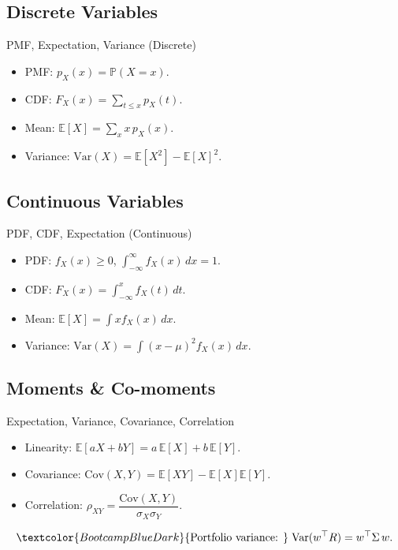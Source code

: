 \documentclass[aspectratio=169]{beamer}
\begin{document}
\subsection{Discrete Variables}
\begin{frame}{PMF, Expectation, Variance (Discrete)}
\begin{itemize}
  \item PMF: \(p_X(x)=\mathbb{P}(X=x)\).
  \item CDF: \(F_X(x)=\sum_{t\le x} p_X(t)\).
  \item Mean: \(\mathbb{E}[X]=\sum_x x\,p_X(x)\).
  \item Variance: \(\mathrm{Var}(X)=\mathbb{E}[X^2]-\mathbb{E}[X]^2\).
\end{itemize}
\end{frame}

\subsection{Continuous Variables}
\begin{frame}{PDF, CDF, Expectation (Continuous)}
\begin{itemize}
  \item PDF: \(f_X(x)\ge 0\), \(\int_{-\infty}^\infty f_X(x)\,dx=1\).
  \item CDF: \(F_X(x)=\int_{-\infty}^x f_X(t)\,dt\).
  \item Mean: \(\mathbb{E}[X]=\int x f_X(x)\,dx\).
  \item Variance: \(\mathrm{Var}(X)=\int (x-\mu)^2 f_X(x)\,dx\).
\end{itemize}
\end{frame}

\subsection{Moments \& Co-moments}
\begin{frame}{Expectation, Variance, Covariance, Correlation}
\begin{itemize}
  \item Linearity: \(\mathbb{E}[aX+bY]=a\,\mathbb{E}[X]+b\,\mathbb{E}[Y]\).
  \item Covariance: \(\mathrm{Cov}(X,Y)=\mathbb{E}[XY]-\mathbb{E}[X]\mathbb{E}[Y]\).
  \item Correlation: \(\rho_{XY}=\dfrac{\mathrm{Cov}(X,Y)}{\sigma_X\sigma_Y}\).
\end{itemize}
\[
\textcolor{BootcampBlueDark}{\text{Portfolio variance: }}\;
\mathrm{Var}(w^\top R)=w^\top \Sigma\, w.
\]
\end{frame}
\end{document}
